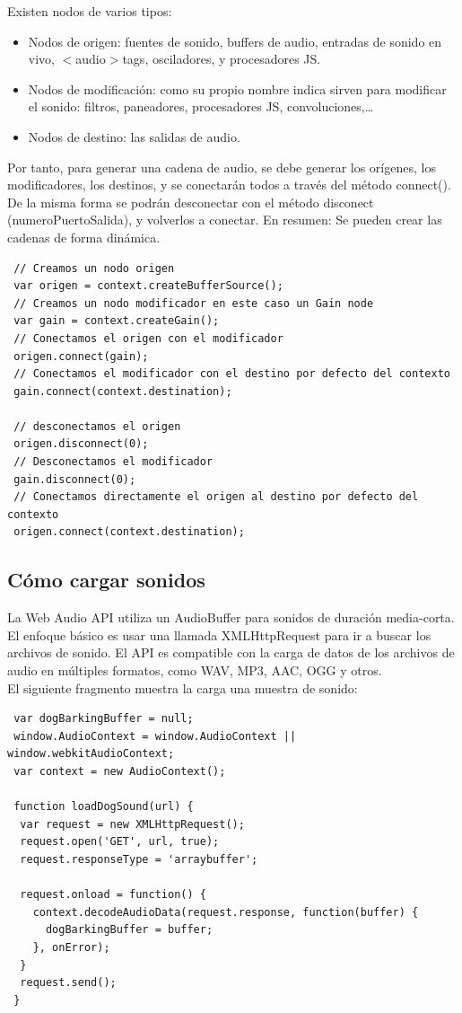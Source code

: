Existen nodos de varios tipos:
\begin{itemize}
 \item Nodos de origen: fuentes de sonido, buffers de audio, entradas de sonido en vivo, $<$audio$>$tags, osciladores, y procesadores JS.
 \item Nodos de modificación: como su propio nombre indica sirven para modificar el sonido: filtros, paneadores, procesadores JS, convoluciones,…
 \item Nodos de destino: las salidas de audio.
\end{itemize}

Por tanto, para generar una cadena de audio, se debe generar los orígenes,  los modificadores, los destinos, y se conectarán todos a través del método connect(). De la misma forma se podrán  desconectar con el método disconect (numeroPuertoSalida), y volverlos a conectar.  En resumen:  Se pueden crear las cadenas de forma dinámica.

\begin{verbatim}
 // Creamos un nodo origen
 var origen = context.createBufferSource();
 // Creamos un nodo modificador en este caso un Gain node
 var gain = context.createGain();
 // Conectamos el origen con el modificador
 origen.connect(gain);
 // Conectamos el modificador con el destino por defecto del contexto
 gain.connect(context.destination);

 // desconectamos el origen
 origen.disconnect(0);
 // Desconectamos el modificador
 gain.disconnect(0);
 // Conectamos directamente el origen al destino por defecto del contexto
 origen.connect(context.destination);
\end{verbatim}

\subsection{Cómo cargar sonidos}
\label{sec:cargar_sonidos}
La Web Audio API utiliza un AudioBuffer para sonidos de duración media-corta. El enfoque básico es usar una llamada XMLHttpRequest para ir a buscar los archivos de sonido. 
El API es compatible con la carga de datos de los archivos de audio en múltiples formatos, como WAV, MP3, AAC, OGG y otros.\\

El siguiente fragmento muestra la carga una muestra de sonido:
\begin{verbatim}
 var dogBarkingBuffer = null;
 window.AudioContext = window.AudioContext || window.webkitAudioContext;
 var context = new AudioContext();

 function loadDogSound(url) {
  var request = new XMLHttpRequest();
  request.open('GET', url, true);
  request.responseType = 'arraybuffer';

  request.onload = function() {
    context.decodeAudioData(request.response, function(buffer) {
      dogBarkingBuffer = buffer;
    }, onError);
  }
  request.send();
 }
\end{verbatim}

